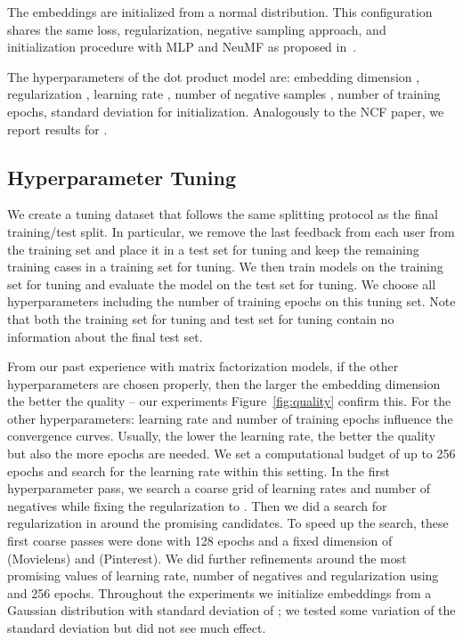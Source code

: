 \documentclass{article}
\begin{document}
The embeddings are initialized from a normal distribution.
This configuration shares the same loss, regularization, negative sampling approach, and initialization procedure with MLP and NeuMF as proposed in~\cite{he:www17}.

The hyperparameters of the dot product model are: embedding dimension , regularization , learning rate , number of negative samples , number of training epochs, standard deviation for initialization.
Analogously to the NCF paper, we report results for .

\subsection{Hyperparameter Tuning}

We create a tuning dataset that follows the same splitting protocol as the final training/test split.
In particular, we remove the last feedback from each user from the training set and place it in a test set for tuning and keep the remaining training cases in a training set for tuning.
We then train models on the training set for tuning and evaluate the model on the test set for tuning.
We choose all hyperparameters including the number of training epochs on this tuning set.
Note that both the training set for tuning and test set for tuning contain no information about the final test set.

From our past experience with matrix factorization models, if the other hyperparameters are chosen properly, then the larger the embedding dimension the better the quality -- our experiments Figure~\ref{fig:quality} confirm this.
For the other hyperparameters: learning rate and number of training epochs influence the convergence curves.
Usually, the lower the learning rate, the better the quality but also the more epochs are needed.
We set a computational budget of up to 256 epochs and search for the learning rate within this setting.
In the first hyperparameter pass, we search a coarse grid of learning rates  and number of negatives  while fixing the regularization to .
Then we did a search for regularization in  around the promising candidates.
To speed up the search, these first coarse passes were done with 128 epochs and a fixed dimension of  (Movielens) and  (Pinterest).
We did further refinements around the most promising values of learning rate, number of negatives and regularization using  and 256 epochs.
Throughout the experiments we initialize embeddings from a Gaussian distribution with standard deviation of ; we tested some variation of the standard deviation but did not see much effect.
\end{document}
